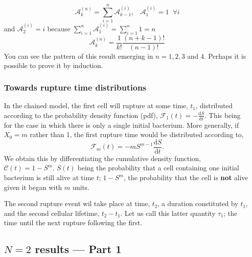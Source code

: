 $$\mathcal{A}^{(n)}_{k} = \sum^{n}_{i=1}\mathcal{A}^{(i)}_{k-1}, \hspace{10pt} \mathcal{A}^{(i)}_{1} = 1 \;\; \forall i $$
 and  $\mathcal{A}^{(i)}_2 = i$ because $\sum_{i=1}^n \mathcal{A}_1^{(i)}= \sum_{i=1}^n 1 = n$
$$\mathcal{A}^{(n)}_{k} =  \frac{1}{k!}\frac{(n+k-1)!}{(n-1)!}$$
You can see the pattern of this result emerging in $n=1,2,3$ and 4. Perhaps it is possible to prove it by induction.


\vspace{20pt}

\subsubsection*{Towards rupture time distributions}

In the chained model, the first cell will rupture at some time, $t_1$, distributed according to the probability density function (pdf), $\mathcal{F}_{1}(t) = -\frac{\mathrm{d}S}{\mathrm{d}t}$. This being for the case in which there is only a single initial bacterium. More generally, if $X_0 = m$ rather than 1, the first rupture time would be distributed according to,
$$\mathcal{F}_{m}(t) = -mS^{m-1}\frac{\mathrm{d}S}{\mathrm{d}t}.$$
We obtain this by differentiating the cumulative density function, $\mathcal{C}(t) = 1 - S^m$. $S(t)$ being the probability that a cell containing one initial bacterium is still alive at time $t$;  $1 - S^m$, the probability that the cell is \textbf{not} alive given it began with $m$ units.\par

The second rupture event wil take place at time, $t_2$, a duration constituted by $t_1$, and the second cellular lifetime, $t_2 - t_1$. Let us call this latter quantity $\tau_1$; the time until the next rupture following the first. \par















\subsection{$N = 2$ results --- Part 1}



